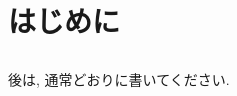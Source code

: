 \documentclass[a4paper, 12pt, dvipdfmx, uplatex]{jsreport}
\begin{document}
\chapter{はじめに}
\section{}
\subsection{}
後は, 通常どおりに書いてください.
\end{document}
